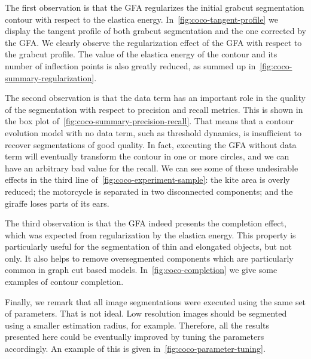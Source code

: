 \documentclass[review]{siamart220329}
\begin{document}
%
%
The first observation is that the GFA regularizes the initial grabcut segmentation contour with respect to the elastica energy. In~\cref{fig:coco-tangent-profile} we display the tangent profile of both grabcut segmentation and the one corrected by the GFA. We clearly observe the regularization effect of the GFA with respect to the grabcut profile. The value of the elastica energy of the contour and its number of inflection points is also greatly reduced, as summed up in~\cref{fig:coco-summary-regularization}.

The second observation is that the data term has an important role in the quality of the segmentation with respect to precision and recall metrics. This is shown in the box plot of~\cref{fig:coco-summary-precision-recall}. That means that a contour evolution model with no data term, such as threshold dynamics, is insufficient to recover segmentations of good quality. In fact, executing the GFA without data term will eventually transform the contour in one or more circles, and we can have an arbitrary bad value for the recall. We can see some of these undesirable effects in the third line of~\cref{fig:coco-experiment-sample}: the kite area is overly reduced; the motorcycle is separated in two disconnected components; and the giraffe loses parts of its ears.

The third observation is that the GFA indeed presents the completion effect, which was expected from regularization by the elastica energy. This property is particularly useful for the segmentation of thin and elongated objects, but not only. It also helps to remove oversegmented components which are particularly common in graph cut based models. In~\cref{fig:coco-completion} we give some examples of contour completion.

Finally, we remark that all image segmentations were executed using the same set of parameters. That is not ideal. Low resolution images should be segmented using a smaller estimation radius, for example. Therefore, all the results presented here could be eventually improved by tuning the parameters accordingly. An example of this is given in~\cref{fig:coco-parameter-tuning}.
\end{document}
